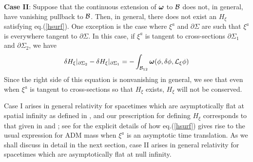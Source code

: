 \noindent
{\bf Case II}: Suppose that the continuous extension of
${\mbox{\boldmath $\omega$}}$ to ${\cal B}$ does not, in general, have
vanishing pullback to ${\cal B}$. Then, in general, there does not
exist an $H_\xi$ satisfying eq.(\ref{hsurf}). One exception is the
case where $\xi^a$ and $\partial \Sigma$ are such that $\xi^a$ is
everywhere tangent to $\partial \Sigma$. In this case, if $\xi^a$ is
tangent to cross-sections $\partial \Sigma_1$ and $\partial \Sigma_2$,
we have
\begin{equation}
\delta H_\xi|_{\partial \Sigma_2} - \delta H_\xi|_{\partial \Sigma_1}
= - \int_{{\cal B}_{12}} {\mbox{\boldmath $\omega$}}(\phi, \delta \phi,
{\cal L}_\xi \phi)
\label{Hnocons}
\end{equation}
Since the right side of this equation is nonvanishing in general, we
see that even when $\xi^a$ is tangent to cross-sections so that
$H_\xi$ exists, $H_\xi$ will not be conserved.

\medskip

Case I arises in general relativity for spacetimes which are
asymptotically flat at spatial infinity as defined in \cite{ar}, and our
prescription for defining $H_\xi$ corresponds to that given in
\cite{adm} and \cite{rt}; see \cite{iw} for the explicit details of
how eq.(\ref{hsurf}) gives rise to the usual expression for ADM mass
when $\xi^a$ is an asymptotic time translation. As we shall discuss in
detail in the next section, case II arises in general relativity for
spacetimes which are asymptotically flat at null infinity.


